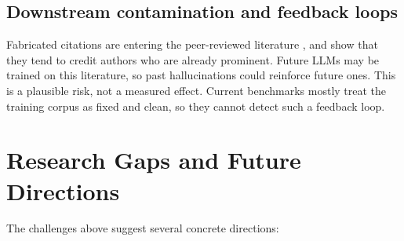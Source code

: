 \documentclass[acmsmall,screen]{acmart}
\begin{document}
\subsection{Downstream contamination and feedback loops}
Fabricated citations are entering the peer-reviewed literature \citep{russinovich2026b,sakai2026,ansari2026}, and \citet{zhao2026} show that they tend to credit authors who are already prominent. Future LLMs may be trained on this literature, so past hallucinations could reinforce future ones. This is a plausible risk, not a measured effect. Current benchmarks mostly treat the training corpus as fixed and clean, so they cannot detect such a feedback loop.

\section{Research Gaps and Future Directions}\label{sec:gaps}
The challenges above suggest several concrete directions:
\end{document}
